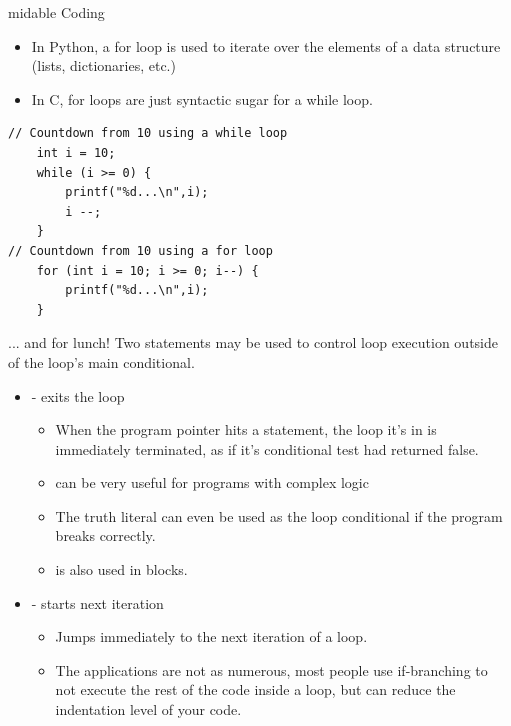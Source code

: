 \documentclass[11pt]{beamer}
\let\OldTexttt\texttt
\renewcommand{\texttt}[1]{\OldTexttt{\color{teal}{#1}}}
\begin{document}
\begin{frame}[fragile=singleslide]{\texttt{for}midable Coding}
\begin{itemize}
\item In Python, a for loop is used to iterate over the elements of a data structure (lists, dictionaries, etc.)
\item In C, for loops are just syntactic sugar for a while loop.
\end{itemize}
\begin{lstlisting}[style = C]
// Countdown from 10 using a while loop
	int i = 10;
	while (i >= 0) {
		printf("%d...\n",i);
		i --;
	}	
// Countdown from 10 using a for loop
	for (int i = 10; i >= 0; i--) {
		printf("%d...\n",i);
	}
\end{lstlisting}
\end{frame}

\begin{frame}{\texttt{continue}... and \texttt{break} for lunch!}
Two statements may be used to control loop execution outside of the loop's main conditional.
\begin{itemize}
\item \texttt{break} - exits the loop
\begin{itemize}
	\item When the program pointer hits a \texttt{break} statement, the loop it's in is immediately terminated, as if it's conditional test had returned false.  
	\item \texttt{break} can be very useful for programs with complex logic
	\item The truth literal can even be used as the loop conditional if the program breaks correctly.
	\item \texttt{break} is also used in \texttt{switch case} blocks.
\end{itemize}
\item \texttt{continue} - starts next iteration
\begin{itemize}
\item Jumps immediately to the next iteration of a loop.
\item The applications are not as numerous, most people use if-branching to not execute the rest of the code inside a loop, but \texttt{continue} can reduce the indentation level of your code.  
\end{itemize}
\end{itemize}

\end{frame}
\end{document}
